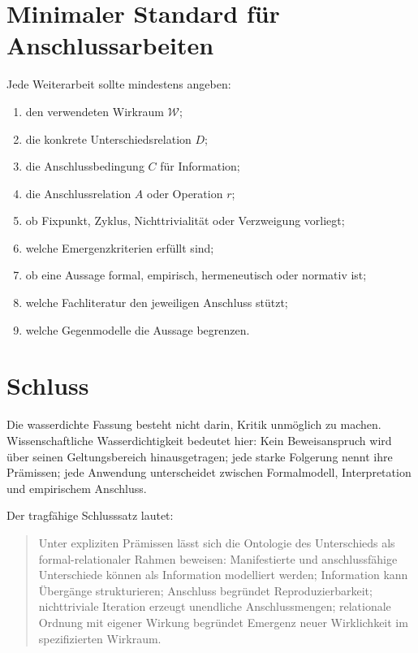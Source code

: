 \documentclass[11pt,a4paper]{article}
\theoremstyle{remark}
\newcommand{\W}{\mathcal{W}}
\begin{document}
\section{Minimaler Standard für Anschlussarbeiten}
Jede Weiterarbeit sollte mindestens angeben:
\begin{enumerate}
    \item den verwendeten Wirkraum $\W$;
    \item die konkrete Unterschiedsrelation $D$;
    \item die Anschlussbedingung $C$ für Information;
    \item die Anschlussrelation $A$ oder Operation $r$;
    \item ob Fixpunkt, Zyklus, Nichttrivialität oder Verzweigung vorliegt;
    \item welche Emergenzkriterien erfüllt sind;
    \item ob eine Aussage formal, empirisch, hermeneutisch oder normativ ist;
    \item welche Fachliteratur den jeweiligen Anschluss stützt;
    \item welche Gegenmodelle die Aussage begrenzen.
\end{enumerate}

\section{Schluss}
Die wasserdichte Fassung besteht nicht darin, Kritik unmöglich zu machen. Wissenschaftliche Wasserdichtigkeit bedeutet hier: Kein Beweisanspruch wird über seinen Geltungsbereich hinausgetragen; jede starke Folgerung nennt ihre Prämissen; jede Anwendung unterscheidet zwischen Formalmodell, Interpretation und empirischem Anschluss.

Der tragfähige Schlusssatz lautet:
\begin{quote}
Unter expliziten Prämissen lässt sich die Ontologie des Unterschieds als formal-relationaler Rahmen beweisen: Manifestierte und anschlussfähige Unterschiede können als Information modelliert werden; Information kann Übergänge strukturieren; Anschluss begründet Reproduzierbarkeit; nichttriviale Iteration erzeugt unendliche Anschlussmengen; relationale Ordnung mit eigener Wirkung begründet Emergenz neuer Wirklichkeit im spezifizierten Wirkraum.
\end{quote}

\appendix
\end{document}
